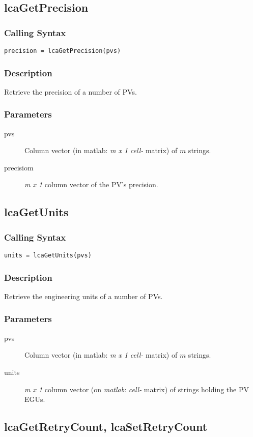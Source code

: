 \documentclass{article}
\newcommand{\matlab}{\ita{matlab}}
\newcommand{\ita}[1]{\emph{#1}}
\newcommand{\m}{$m$}
\newcommand{\mhack}{$m$} %
\newcommand{\mxl}{$m\times 1$}
\renewcommand{\m}{\ita{m}}
\newcommand{\mhack}{\ita{m}} %
\renewcommand{\mxl}{\ita{m x 1}}
\newcommand{\PVITEM}{
\item[pvs] Column vector (in matlab: \mxl{} \ita{cell-} matrix)
of \mhack{} strings.
}
\begin{document}
\subsection{lcaGetPrecision}
\subsubsection{Calling Syntax}
\begin{verbatim}
precision = lcaGetPrecision(pvs)
\end{verbatim}
\subsubsection{Description}
Retrieve the precision of a number of PVs.
\subsubsection{Parameters}
\begin{description}
\PVITEM
\item[precisiom] \mxl{} column vector of the PV's precision.
\end{description}

\subsection{lcaGetUnits}
\subsubsection{Calling Syntax}
\begin{verbatim}
units = lcaGetUnits(pvs)
\end{verbatim}
\subsubsection{Description}
Retrieve the engineering units of a number of PVs.
\subsubsection{Parameters}
\begin{description}
\PVITEM
\item[units] \mxl{} column vector (on \matlab: \ita{cell-} matrix)
of strings holding the PV EGUs.
\end{description}

\subsection{lcaGetRetryCount, lcaSetRetryCount}
\label{retrycnt}
\end{document}

